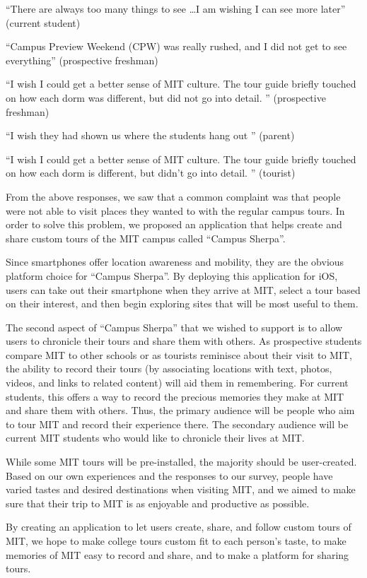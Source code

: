 \documentclass{sigchi}
\begin{document}
``There are always too many things to see \ldots I am wishing I can see more later'' (current student)

``Campus Preview Weekend (CPW) was really rushed, and I did not get to see everything'' (prospective freshman)

``I wish I could get a better sense of MIT culture. The tour guide briefly touched on how each dorm was different, but did not go into detail. '' (prospective freshman)

``I wish they had shown us where the students hang out '' (parent)

``I wish I could get a better sense of MIT culture. The tour guide briefly touched on how each dorm is different, but didn't go into detail. '' (tourist)

From the above responses, we saw that a common complaint was that people were not able to visit places they wanted to with the regular campus tours. In order to solve this problem, we proposed an application that helps create and share custom tours of the MIT campus called ``Campus Sherpa''.

Since smartphones offer location awareness and mobility, they are the obvious platform choice for ``Campus Sherpa''. By deploying this application for iOS, users can take out their smartphone when they arrive at MIT, select a tour based on their interest, and then begin exploring sites that will be most useful to them.

The second aspect of ``Campus Sherpa'' that we wished to support is to allow users to chronicle their tours and share them with others. As prospective students compare MIT to other schools or as tourists reminisce about their visit to MIT, the ability to record their tours (by associating locations with text, photos, videos, and links to related content) will aid them in remembering. For current students, this offers a way to record the precious memories they make at MIT and share them with others. Thus, the primary audience will be people who aim to tour MIT and record their experience there. The secondary audience will be current MIT students who would like to chronicle their lives at MIT.

While some MIT tours will be pre-installed, the majority should be user-created.
Based on our own experiences and the responses to our survey, people have varied tastes and desired destinations when visiting MIT, and we aimed to make sure that their trip to MIT is as enjoyable and productive as possible.

By creating an application to let users create, share, and follow custom tours of MIT, we hope to make college tours custom fit to each person's taste, to make memories of MIT easy to record and share, and to make a platform for sharing tours.
\end{document}
